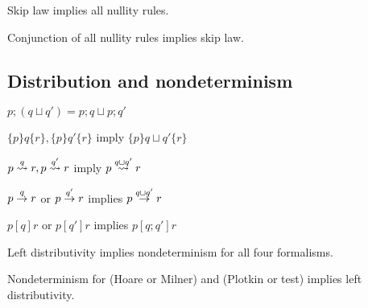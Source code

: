 \documentclass{article}
\begin{document}
\begin{theorem}
Skip law implies all nullity rules.
\end{theorem}

\begin{theorem}
Conjunction of all nullity rules implies skip law.
\end{theorem}


\subsection*{Distribution and nondeterminism}

\begin{definition}[$\sqcup$]
\end{definition}

\begin{law}
$p; (q \sqcup q') = p;q \sqcup p;q'$
\end{law}

\begin{rul}
$\{p\}q\{r\}, \{p\}q'\{r\}$ imply $\{p\}q\sqcup q'\{r\}$
\end{rul}

\begin{rul}
$p \stackrel{q}{\leadsto} r, p \stackrel{q'}{\leadsto} r$ imply $p \stackrel{q\sqcup q'}{\leadsto} r$
\end{rul}

\begin{rul}
$p \stackrel{q}{\rightarrow} r$ or $p \stackrel{q'}{\rightarrow} r$ implies $p \stackrel{q\sqcup q'}{\rightarrow} r$
\end{rul}

\begin{rul}
$p [q] r$ or $p [q'] r$ implies $p [q;q'] r$
\end{rul}

\begin{theorem}
Left distributivity implies nondeterminism for all four formalisms.
\end{theorem}


\begin{theorem}
Nondeterminism for (Hoare or Milner) and (Plotkin or test) 
implies left distributivity.
\end{theorem}
\end{document}
